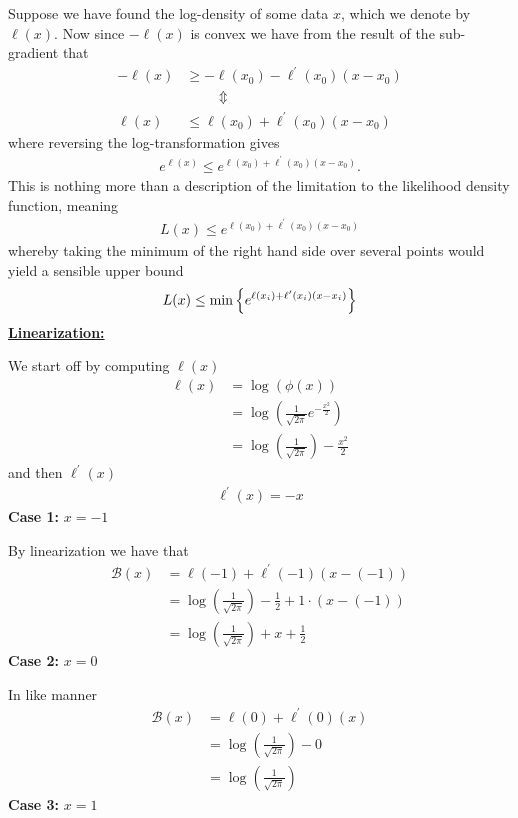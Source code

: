 Suppose we have found the log-density of some data $x$, which we denote by $\ell(x)$. Now since $-\ell(x)$ is convex we have from the result of the sub-gradient that 
\begin{align*}
    -\ell(x) &\geq -\ell(x_0) - \ell^{\prime}(x_0)(x - x_0) \\[5pt]
    & \hspace{1cm} \Updownarrow \\[5pt]
    \ell(x) &\leq \ell(x_0) + \ell^{\prime}(x_0)(x - x_0)
\end{align*}
where reversing the log-transformation gives 
\begin{align}
    e^{\ell(x)} \leq e^{\ell(x_0) + \ell^{\prime}(x_0)(x - x_0)}.
\end{align}
This is nothing more than a description of the limitation to the likelihood density function, meaning 
\begin{align*}
    L(x) \leq e^{\ell(x_0) + \ell^{\prime}(x_0)(x - x_0)}
\end{align*}
whereby taking the minimum of the right hand side over several points would yield a sensible upper bound 
\begin{align}
    L(x) \leq \min \left\{ e^{\ell(x_i) + \ell^{\prime}(x_i)(x - x_i)} \right\}
\end{align}
\underline{\textbf{Linearization:}}

We start off by computing $\ell(x)$
\begin{align*}
    \ell(x) &= \log \left( \phi(x) \right) \\[5pt]
    &= \log \left(\frac{1}{\sqrt{2\pi}}e^{-\frac{x^2}{2}} \right) \\[5pt] 
    &= \log \left( \frac{1}{\sqrt{2 \pi}} \right) - \frac{x^2}{2}
\end{align*}
and then $\ell^{\prime}(x)$  
\begin{align*}
    \ell^{\prime}(x) = -x
\end{align*}
\textbf{Case 1:} $x = -1$

By linearization we have that 
\begin{align}
    \mathcal{B}(x) &= \ell(-1) + \ell^{\prime}(-1)(x - (-1)) \\[5pt]
        &= \log \left( \frac{1}{\sqrt{2 \pi}} \right) - \frac{1}{2} + 1 \cdot(x -(-1)) \\[5pt]
        &= \log \left( \frac{1}{\sqrt{2 \pi}} \right) + x + \frac{1}{2}
\end{align}
\textbf{Case 2:} $x = 0$

In like manner 
\begin{align}
    \mathcal{B}(x) &= \ell(0) + \ell^{\prime}(0)(x) \\[5pt]
        &= \log \left( \frac{1}{\sqrt{2 \pi}} \right) - 0\\[5pt]
        &= \log \left( \frac{1}{\sqrt{2 \pi}} \right)
\end{align}
\textbf{Case 3:} $x = 1$

